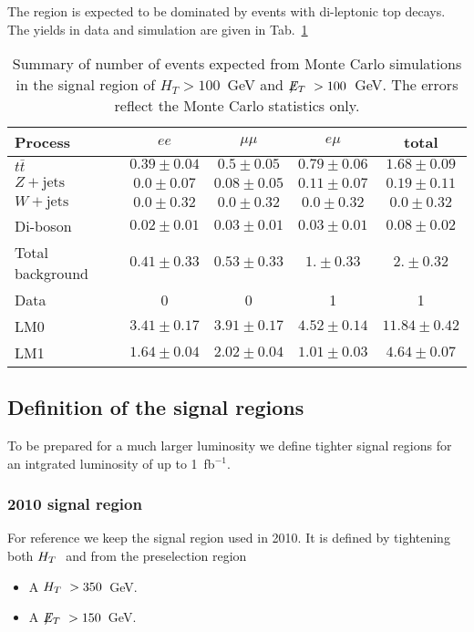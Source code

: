 The region is expected to be dominated by events with di-leptonic
top decays. The yields in data and simulation are given in
Tab.~\ref{tab:presel}

\begin{table}[htb]
\begin{center}
\caption{\label{tab:presel}\protect Summary of number of events expected from Monte Carlo simulations in 
the signal region of $H_T> 100$~GeV and $\displaystyle{\not} E_T~> 100$~GeV. The errors reflect the Monte Carlo statistics only.}
\begin{tabular}{l|ccc|c}
\hline
Process           & $ee$       & $\mu\mu$     & $e\mu$   & total   \\
\hline\hline
$t\bar{t}$       &$0.39 \pm 0.04$&$0.5 \pm 0.05$&$0.79 \pm 0.06$&$1.68 \pm 0.09$\\
$Z+\textrm{jets}$  &$0.0 \pm 0.07$&$0.08 \pm 0.05$&$0.11 \pm 0.07$&$0.19 \pm 0.11$\\
$W+\textrm{jets}$  &$0.0 \pm 0.32$&$0.0 \pm 0.32$&$0.0 \pm 0.32$&$0.0 \pm 0.32$\\
Di-boson          & $0.02 \pm 0.01$&$0.03 \pm 0.01$&$0.03 \pm 0.01$ & $0.08\pm 0.02$ \\
\hline
Total background  &$0.41 \pm 0.33$&$0.53 \pm 0.33$&$1. \pm 0.33$&$2. \pm 0.32$\\
\hline
Data  & 0 & 0 & 1 & 1 \\
\hline\hline
LM0               &$3.41 \pm 0.17$&$3.91 \pm 0.17$&$4.52 \pm 0.14$&$11.84 \pm 0.42$ \\
LM1               &$1.64 \pm 0.04$&$2.02 \pm 0.04$&$1.01 \pm 0.03$&$4.64 \pm 0.07$ \\
\hline
\end{tabular}
\end{center}
\end{table}


\subsection{Definition of the signal regions}

To be prepared for a much larger luminosity we
define tighter signal regions for an
intgrated luminosity of up to 1~fb$^{-1}$.

\subsubsection{2010 signal region}
For reference we keep the signal region used in 2010. It is defined by
tightening both $H_T~$ and \MET from the preselection region
\begin{itemize}
\item A $H_T~>350$~GeV.
\item A $\displaystyle{\not} E_T~>150$~GeV.
\end{itemize}


